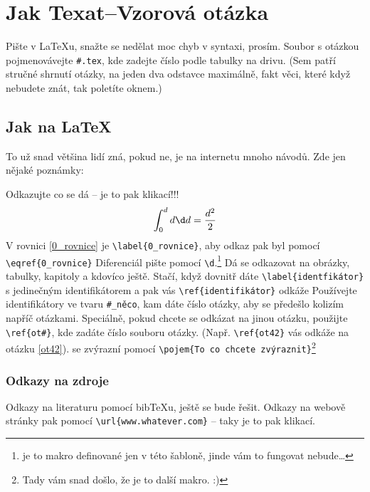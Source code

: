\section{Jak Texat--Vzorová otázka} %

\begin{shrnuti}
Pište v \LaTeX u, snažte se nedělat moc chyb v syntaxi, prosím. Soubor s otázkou pojmenovávejte \verb"#.tex", kde zadejte číslo podle tabulky na drivu.
(Sem patří stručné shrnutí otázky, na jeden dva odstavce maximálně, fakt věci, které když nebudete znát, tak poletíte oknem.)
\end{shrnuti}

\subsection*{Jak na \LaTeX}
To už snad většina lidí zná, pokud ne, je na internetu mnoho návodů. Zde jen nějaké poznámky:

Odkazujte co se dá -- je to pak klikací!!!
\begin{equation}
\label{0_rovnice}
\int_0^d d \d d = \frac{d^2}{2}
\end{equation}
V rovnici \eqref{0_rovnice} je \verb"\label{0_rovnice}", 
aby odkaz pak byl pomocí \verb"\eqref{0_rovnice}"
Diferenciál pište pomocí \verb"\d".\footnote{je to makro definované jen v této šabloně, 
jinde vám to fungovat nebude\dots}
Dá se odkazovat na obrázky, tabulky, kapitoly a kdovíco ještě. Stačí, když dovnitř dáte 
\verb"\label{identfikátor}" s jedinečným identifikátorem a pak vás 
\verb"\ref{identifikátor}" odkáže Používejte identifikátory ve tvaru \verb"#_něco", kam 
dáte číslo otázky, aby se předešlo kolizím napříč otázkami.
Speciálně, pokud chcete 
se odkázat na jinou otázku, použijte \verb"\ref{ot#}", kde zadáte číslo souboru otázky. 
(Např. \verb"\ref{ot42}" vás odkáže na otázku \ref{ot42}).
 se zvýrazní pomocí \verb"\pojem{To co chcete zvýraznit}"\footnote{Tady 
vám snad došlo, že je to další makro. :)} 
\subsubsection*{Odkazy na zdroje}
Odkazy na literaturu pomocí bib\TeX u, ještě se bude řešit.
Odkazy na webově stránky pak pomocí \verb"\url{www.whatever.com}" -- taky je to pak klikací.

